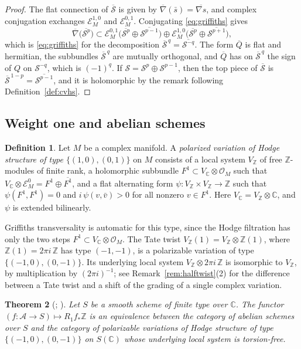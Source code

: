 \documentclass[11pt]{amsart}
\newtheorem{theorem}{Theorem}[section]
\theoremstyle{definition}
\newtheorem{definition}[theorem]{Definition}
\theoremstyle{remark}
\numberwithin{equation}{section}
\newcommand{\Z}{\mathbb{Z}}
\newcommand{\C}{\mathbb{C}}
\newcommand{\cS}{\mathcal{S}}
\newcommand{\cO}{\mathcal{O}}
\newcommand{\cE}{\mathcal{E}}
\newcommand{\cA}{\mathcal{A}}
\begin{document}
\begin{proof}
The flat connection of $\overline{\cS}$ is given by $\overline\nabla(\bar s)=\overline{\nabla s}$, and complex conjugation exchanges $\cE^{1,0}_M$ and $\cE^{0,1}_M$. Conjugating \eqref{eq:griffiths} gives
\[
\overline\nabla\big(\overline{\cS^p}\big)\subset\cE^{0,1}_M\big(\overline{\cS^p}\oplus\overline{\cS^{p-1}}\big)\oplus\cE^{1,0}_M\big(\overline{\cS^p}\oplus\overline{\cS^{p+1}}\big),
\]
which is \eqref{eq:griffiths} for the decomposition $\overline{\cS}^{\,q}=\overline{\cS^{-q}}$. The form $\overline Q$ is flat and hermitian, the subbundles $\overline{\cS}^{\,q}$ are mutually orthogonal, and $\overline Q$ has on $\overline{\cS}^{\,q}$ the sign of $Q$ on $\cS^{-q}$, which is $(-1)^q$. If $\cS=\cS^p\oplus\cS^{p-1}$, then the top piece of $\overline{\cS}$ is $\overline{\cS}^{\,1-p}=\overline{\cS^{p-1}}$, and it is holomorphic by the remark following Definition~\ref{def:cvhs}.
\end{proof}

\subsection{Weight one and abelian schemes}
\begin{definition}\label{def:zvhs}
Let $M$ be a complex manifold. A \emph{polarized variation of Hodge structure of type $\{(1,0),(0,1)\}$} on $M$ consists of a local system $V_\Z$ of free $\Z$-modules of finite rank, a holomorphic subbundle $F^1\subset V_\C\otimes\cO_M$ such that $V_\C\otimes\cE^0_M=F^1\oplus\overline{F^1}$, and a flat alternating form $\psi:V_\Z\times V_\Z\to\Z$ such that $\psi(F^1,F^1)=0$ and $i\,\psi(v,\bar v)>0$ for all nonzero $v\in F^1$. Here $V_\C=V_\Z\otimes\C$, and $\psi$ is extended bilinearly.
\end{definition}

Griffiths transversality is automatic for this type, since the Hodge filtration has only the two steps $F^1\subset V_\C\otimes\cO_M$. The Tate twist $V_\Z(1)=V_\Z\otimes\Z(1)$, where $\Z(1)=2\pi i\,\Z$ has type $(-1,-1)$, is a polarizable variation of type $\{(-1,0),(0,-1)\}$. Its underlying local system $V_\Z\otimes2\pi i\,\Z$ is isomorphic to $V_\Z$, by multiplication by $(2\pi i)^{-1}$; see Remark~\ref{rem:halftwist}(2) for the difference between a Tate twist and a shift of the grading of a single complex variation.

\begin{theorem}[{\citet[4.4.3]{Deligne1971}; \citet[Theorem~7.13]{Milne2013}}]\label{thm:deligne}
Let $S$ be a smooth scheme of finite type over $\C$. The functor $(f:\cA\to S)\mapsto R_1f_*\Z$ is an equivalence between the category of abelian schemes over $S$ and the category of polarizable variations of Hodge structure of type $\{(-1,0),(0,-1)\}$ on $S(\C)$ whose underlying local system is torsion-free.
\end{theorem}
\end{document}
